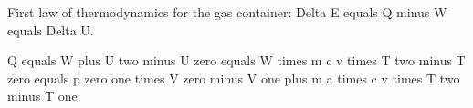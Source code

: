 First law of thermodynamics for the gas container:
Delta E equals Q minus W equals Delta U.

Q equals W plus U two minus U zero equals W times m c v times T two minus T zero equals p zero one times V zero minus V one plus m a times c v times T two minus T one.